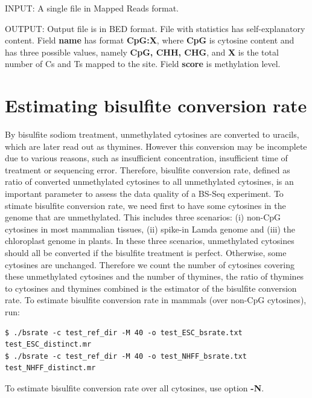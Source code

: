 \documentclass{article}
\begin{document}
INPUT: A single file in Mapped Reads format.

OUTPUT: Output file is in BED format. File with statistics has self-explanatory content.
Field \textbf{name} has format \textbf{CpG:X}, where \textbf{CpG} is cytosine content and has 
three possible values, namely \textbf{CpG, CHH, CHG}, and \textbf{X} is the total number of 
Cs and Ts mapped to the site. Field \textbf{score} is methylation level.

\section{Estimating bisulfite conversion rate}
\label{sec:estim-busilf-conv}
By bisulfite sodiom treatment, unmethylated cytosines are converted to
uracils, which are later read out as thymines. However this conversion
may be incomplete due to various reasons, such as insufficient
concentration, insufficient time of treatment or sequencing
error. Therefore, bisulfite conversion rate, defined as ratio of
converted unmethylated cytosines to all unmethylated cytosines, is an
important parameter to assess the data quality of a BS-Seq
experiment. To stimate bisulfite conversion rate, we need first to
have some cytosines in the genome that are unmethylated. This includes
three scenarios: (i) non-CpG cytosines in most mammalian tissues, (ii)
spike-in Lamda genome and (iii) the chloroplast genome in plants. In
these three scenarios, unmethylated cytosines should all be converted
if the bisulfite treatment is perfect. Otherwise, some cytosines are
unchanged. Therefore we count the number of cytosines covering these
unmethylated cytosines and the number of thymines, the ratio of
thymines to cytosines and thymines combined is the estimator of the
bisulfite conversion rate.
To estimate bisulfite conversion rate in mammals (over non-CpG cytosines), run:
\begin{verbatim}
$ ./bsrate -c test_ref_dir -M 40 -o test_ESC_bsrate.txt test_ESC_distinct.mr
$ ./bsrate -c test_ref_dir -M 40 -o test_NHFF_bsrate.txt test_NHFF_distinct.mr
\end{verbatim}
\begin{flushleft}To estimate bisulfite conversion rate over all cytosines, use
option \textbf{-N}.\end{flushleft}
\end{document}
